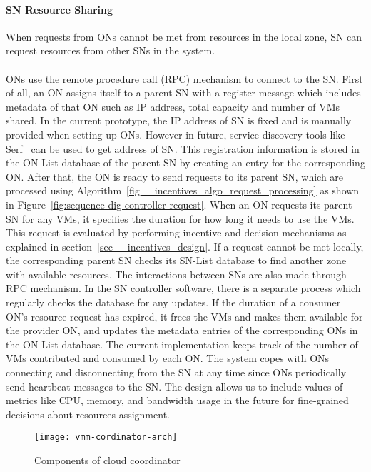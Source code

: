 \paragraph{SN Resource Sharing} 
When requests from ONs cannot be met from resources in the local zone, 
SN can request resources from other SNs in the system.

\paragraph{}
ONs use the remote procedure call (RPC) mechanism to connect to the SN. 
First of all, an ON assigns itself to a parent SN with a register message which includes metadata of that ON such as IP address, total capacity and number of VMs shared. 
In the current prototype, the IP address of SN is fixed and is manually provided when setting up ONs.
However in future, service discovery tools like Serf~\cite{Serf} can be used to get address of SN.
This registration information is stored in the ON-List database of the parent SN by creating an entry for the corresponding ON. 
After that, the ON is ready to send requests to its parent SN, 
which are processed using Algorithm~\ref{fig__incentives_algo_request_processing}
as shown in Figure~\ref{fig:sequence-dig-controller-request}.
When an ON requests its parent SN for any VMs, it specifies the duration for how long it needs to use the VMs. 
This request is evaluated by performing incentive and decision mechanisms as explained in section~\ref{sec__incentives_design}. 
If a request cannot be met locally, the corresponding parent SN checks its SN-List database to find another zone with available resources. 
The interactions between SNs are also made through RPC mechanism.
In the SN controller software, there is a separate process which regularly checks the database for any updates. 
If the duration of a consumer ON's resource request has expired, 
it frees the VMs and makes them available for the provider ON, 
and updates the metadata entries of the corresponding ONs in the ON-List database.
The current implementation keeps track of the number of VMs contributed and consumed by each ON. 
The system copes with ONs connecting and disconnecting from the SN at any time since ONs periodically send heartbeat messages to the SN. 
The design allows us to include values of metrics like CPU, memory, and bandwidth usage in the future for fine-grained decisions about resources assignment. 

\begin{figure}[tbp]
\centering
	\texttt{[image: vmm-cordinator-arch]}
	\caption{Components of cloud coordinator}
	\label{fig:cloud-coordinator-arch}
\end{figure}